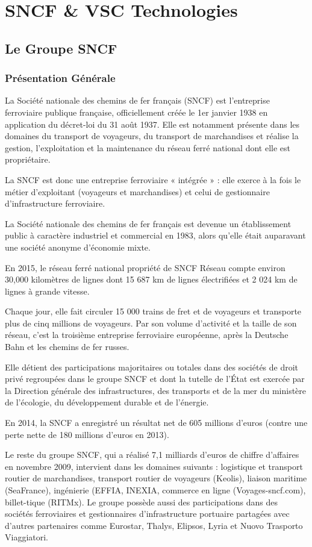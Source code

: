 \section{SNCF \& VSC Technologies}
\subsection{Le Groupe SNCF}

\subsubsection{Présentation Générale}
La Société nationale des chemins de fer français (SNCF) est l'entreprise ferroviaire publique française, officiellement créée le 1er janvier 1938 en application du décret-loi du 31 août 1937.
Elle est notamment présente dans les domaines du transport de voyageurs, du transport de marchandises et réalise la gestion, l'exploitation et la maintenance du réseau ferré national dont elle est propriétaire.

La SNCF est donc une entreprise ferroviaire « intégrée » : elle exerce à la fois le métier d'exploitant (voyageurs et marchandises) et celui de gestionnaire d'infrastructure ferroviaire.

La Société nationale des chemins de fer français est devenue un établissement public à caractère industriel et commercial en 1983, alors qu'elle était auparavant une société anonyme d'économie mixte.

En 2015, le réseau ferré national propriété de SNCF Réseau compte environ 30,000 kilomètres de lignes dont 15 687 km de lignes électrifiées et 2 024 km de lignes à grande vitesse.

Chaque jour, elle fait circuler 15 000 trains de fret et de voyageurs et transporte plus de cinq millions de voyageurs. Par son volume d'activité et la taille de son réseau, c'est la troisième entreprise ferroviaire européenne, après la Deutsche Bahn et les chemins de fer russes.

Elle détient des participations majoritaires ou totales dans des sociétés de droit privé regroupées dans le groupe SNCF et dont la tutelle de l'État est exercée par la Direction générale des infrastructures, des transports et de la mer du ministère de l'écologie, du développement durable et de l'énergie.

En 2014, la SNCF a enregistré un résultat net de 605 millions d'euros (contre une perte nette de 180 millions d'euros en 2013).

Le reste du groupe SNCF, qui a réalisé 7,1 milliards d'euros de chiffre d'affaires en novembre 2009, intervient dans les domaines suivants : logistique et transport routier de marchandises, transport routier de voyageurs (Keolis), liaison maritime (SeaFrance), ingénierie (EFFIA, INEXIA, commerce en ligne (Voyages-sncf.com), billet-tique (RITMx). Le groupe possède aussi des participations dans des sociétés ferroviaires et gestionnaires d'infrastructure portuaire partagées avec d'autres partenaires comme Eurostar, Thalys, Elipsos, Lyria et Nuovo Trasporto Viaggiatori.

